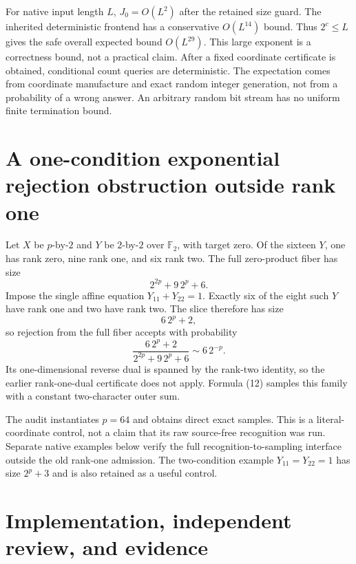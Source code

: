 \documentclass[11pt]{article}
\newcommand{\F}{\mathbb F}
\begin{document}
For native input length $L$, $J_0=O(L^2)$ after the retained size guard.
The inherited deterministic frontend has a conservative $O(L^{14})$ bound.
Thus $2^c\le L$ gives the safe overall expected bound $O(L^{29})$.
This large exponent is a correctness bound, not a practical claim.
After a fixed coordinate certificate is obtained, conditional count queries
are deterministic. The expectation comes from coordinate manufacture and
exact random integer generation, not from a probability of a wrong answer.
An arbitrary random bit stream has no uniform finite termination bound.

\section{A one-condition exponential rejection obstruction outside rank one}

Let $X$ be $p$-by-$2$ and $Y$ be $2$-by-$2$ over $\F_2$, with target zero.
Of the sixteen $Y$, one has rank zero, nine rank one, and six rank two.
The full zero-product fiber has size
\[
 2^{2p}+9\,2^p+6.
\]
Impose the single affine equation $Y_{11}+Y_{22}=1$.
Exactly six of the eight such $Y$ have rank one and two have rank two.
The slice therefore has size
\[
 6\,2^p+2,
\]
so rejection from the full fiber accepts with probability
\[
 \frac{6\,2^p+2}{2^{2p}+9\,2^p+6}\sim6\,2^{-p}.             \tag{14}
\]
Its one-dimensional reverse dual is spanned by the rank-two identity, so
the earlier rank-one-dual certificate does not apply. Formula (12) samples
this family with a constant two-character outer sum.

The audit instantiates $p=64$ and obtains direct exact samples. This is a
literal-coordinate control, not a claim that its raw source-free
recognition was run. Separate native examples below verify the full
recognition-to-sampling interface outside the old rank-one admission.
The two-condition example $Y_{11}=Y_{22}=1$ has size $2^p+3$ and is also
retained as a useful control.

\section{Implementation, independent review, and evidence}
\end{document}
